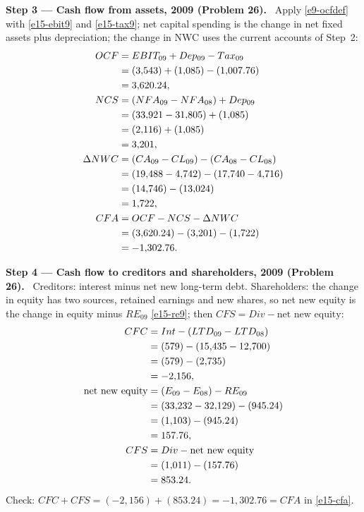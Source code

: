\documentclass[11pt,a4paper]{article}
\newcommand{\step}[2]{\par\medskip\noindent\textbf{Step #1 --- #2.}~}
\begin{document}
\step{3}{Cash flow from assets, 2009 (Problem 26)}
Apply \eqref{e9-ocfdef} with \eqref{e15-ebit9} and \eqref{e15-tax9}; net capital spending is the change
in net fixed assets plus depreciation; the change in NWC uses the current accounts of Step~2:
\begin{align}
  OCF &= EBIT_{09} + Dep_{09} - Tax_{09} \notag\\
  &= (3{,}543) + (1{,}085) - (1{,}007.76) \notag\\
  &= 3{,}620.24, \notag\\
  NCS &= (NFA_{09} - NFA_{08}) + Dep_{09} \notag\\
  &= (33{,}921 - 31{,}805) + (1{,}085) \notag\\
  &= (2{,}116) + (1{,}085) \notag\\
  &= 3{,}201, \notag\\
  \Delta NWC &= (CA_{09} - CL_{09}) - (CA_{08} - CL_{08}) \notag\\
  &= (19{,}488 - 4{,}742) - (17{,}740 - 4{,}716) \notag\\
  &= (14{,}746) - (13{,}024) \notag\\
  &= 1{,}722, \notag\\
  CFA &= OCF - NCS - \Delta NWC \notag\\
  &= (3{,}620.24) - (3{,}201) - (1{,}722) \notag\\
  &= -1{,}302.76. \label{e15-cfa}
\end{align}

\step{4}{Cash flow to creditors and shareholders, 2009 (Problem 26)}
Creditors: interest minus net new long-term debt. Shareholders: the change in equity has two
sources, retained earnings and new shares, so net new equity is the change in equity minus
$RE_{09}$ \eqref{e15-re9}; then $CFS = Div - \text{net new equity}$:
\begin{align}
  CFC &= Int - (LTD_{09} - LTD_{08}) \notag\\
  &= (579) - (15{,}435 - 12{,}700) \notag\\
  &= (579) - (2{,}735) \notag\\
  &= -2{,}156, \label{e15-cfc}\\
  \text{net new equity} &= (E_{09} - E_{08}) - RE_{09} \notag\\
  &= (33{,}232 - 32{,}129) - (945.24) \notag\\
  &= (1{,}103) - (945.24) \notag\\
  &= 157.76, \notag\\
  CFS &= Div - \text{net new equity} \notag\\
  &= (1{,}011) - (157.76) \notag\\
  &= 853.24. \label{e15-cfs}
\end{align}
Check: $CFC + CFS = (-2{,}156) + (853.24) = -1{,}302.76 = CFA$ in \eqref{e15-cfa}.
\end{document}
